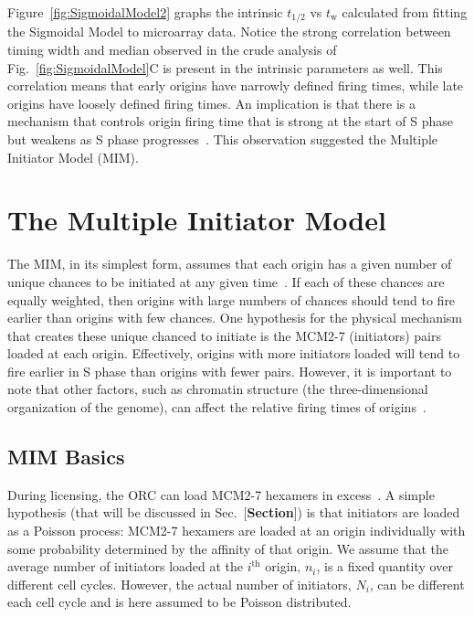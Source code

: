 {	Figure~\ref{fig:SigmoidalModel2} graphs the intrinsic $t_{1/2}$ vs $t_{\text{w}}$ calculated from fitting the Sigmoidal Model to microarray data.
	Notice the strong correlation between timing width and median observed in the crude analysis of Fig.~\ref{fig:SigmoidalModel}C is present in the intrinsic parameters as well.
	This correlation means that early origins have narrowly defined firing times, while late origins have loosely defined firing times.
	An implication is that there is a mechanism that controls origin firing time that is strong at the start of S phase but weakens as S phase progresses~\cite{ScottsThesis}.
	This observation suggested the Multiple Initiator Model (MIM).
	
	
	
	\section{The Multiple Initiator Model}
	\label{sec:MIM}
	
	The MIM, in its simplest form, assumes that each origin has a given number of unique chances to be initiated at any given time~\cite{ScottsThesis}.
	If each of these chances are equally weighted, then origins with large numbers of chances should tend to fire earlier than origins with few chances.
	One hypothesis for the physical mechanism that creates these unique chanced to initiate is the MCM2-7 (initiators) pairs loaded at each origin.
	Effectively, origins with more initiators loaded will tend to fire earlier in S phase than origins with fewer pairs.
	However, it is important to note that other factors, such as chromatin structure (the three-dimensional organization of the genome), can affect the relative firing times of origins~\cite{Chromatin}.
	
		\subsection{MIM Basics}
		\label{subsec:MIMBasics}
		During licensing, the ORC can load MCM2-7 hexamers in excess~\cite{MultiMCM}.
		A simple hypothesis (that will be discussed in Sec.~[\textbf{Section}]) is that initiators are loaded as a Poisson process:
		MCM2-7 hexamers are loaded at an origin individually with some probability determined by the affinity of that origin.
		We assume that the average number of initiators loaded at the $i^{\text{th}}$ origin, $n_i$, is a fixed quantity over different cell cycles.
		However, the actual number of initiators, $N_i$, can be different each cell cycle and is here assumed to be Poisson distributed.
		
}

